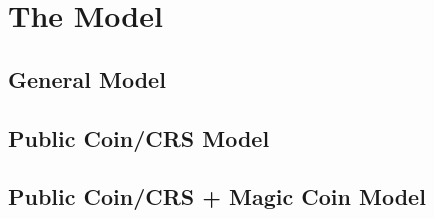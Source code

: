 \section{The Model}

\subsection{General Model}

\subsection{Public Coin/CRS Model}

\subsection{Public Coin/CRS + Magic Coin Model}

